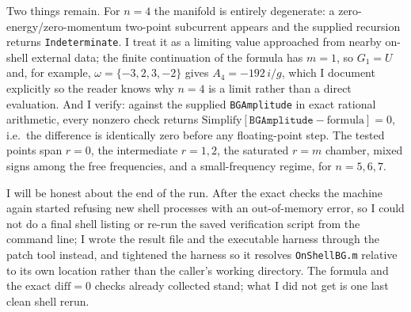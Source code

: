 \documentclass{article}
\begin{document}
Two things remain. For $n=4$ the manifold is entirely degenerate: a
zero-energy/zero-momentum two-point subcurrent appears and the supplied recursion
returns \texttt{Indeterminate}. I treat it as a limiting value approached from
nearby on-shell external data; the finite continuation of the formula has $m=1$,
so $G_1=U$ and, for example, $\omega=\{-3,2,3,-2\}$ gives $A_4=-192\,i/g$, which I
document explicitly so the reader knows why $n=4$ is a limit rather than a direct
evaluation. And I verify: against the supplied \texttt{BGAmplitude} in exact
rational arithmetic, every nonzero check returns
$\mathrm{Simplify}[\texttt{BGAmplitude}-\text{formula}]=0$, i.e.\ the difference is
identically zero before any floating-point step. The tested points span $r=0$,
the intermediate $r=1,2$, the saturated $r=m$ chamber, mixed signs among the free
frequencies, and a small-frequency regime, for $n=5,6,7$.

I will be honest about the end of the run. After the exact checks the machine
again started refusing new shell processes with an out-of-memory error, so I
could not do a final shell listing or re-run the saved verification script from
the command line; I wrote the result file and the executable harness through the
patch tool instead, and tightened the harness so it resolves \texttt{OnShellBG.m}
relative to its own location rather than the caller's working directory. The
formula and the exact $\mathrm{diff}=0$ checks already collected stand; what I did
not get is one last clean shell rerun.
\end{document}

